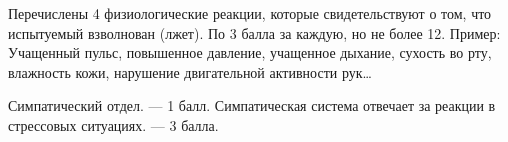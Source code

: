\solutionSection

Перечислены 4 физиологические реакции, которые свидетельствуют о том, что испытуемый взволнован (лжет). По 3 балла за каждую, но не более 12. Пример: Учащенный пульс, повышенное давление, учащенное дыхание, сухость во рту, влажность кожи, нарушение двигательной активности рук… 

Симпатический отдел. — 1 балл.
Симпатическая система отвечает за реакции в стрессовых ситуациях. — 3 балла.